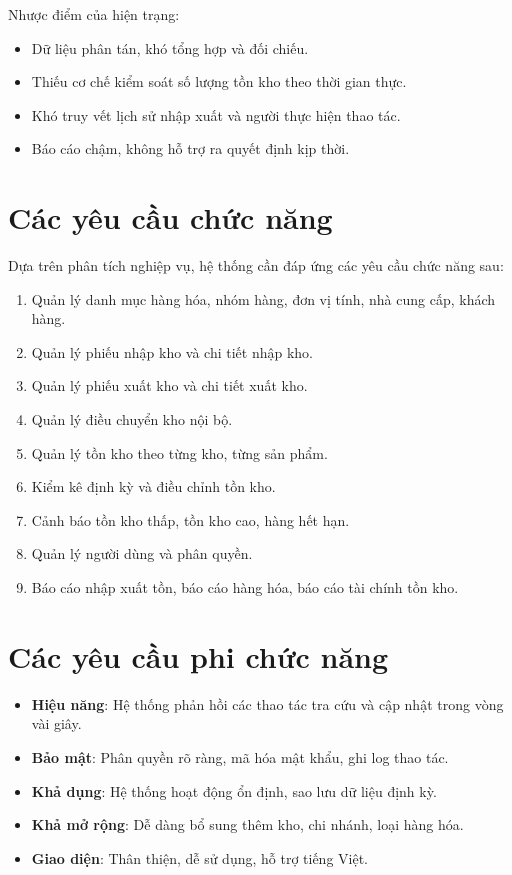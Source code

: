 Nhược điểm của hiện trạng:
\begin{itemize}[leftmargin=1.5cm]
    \item Dữ liệu phân tán, khó tổng hợp và đối chiếu.
    \item Thiếu cơ chế kiểm soát số lượng tồn kho theo thời gian thực.
    \item Khó truy vết lịch sử nhập xuất và người thực hiện thao tác.
    \item Báo cáo chậm, không hỗ trợ ra quyết định kịp thời.
\end{itemize}

\section{Các yêu cầu chức năng}

Dựa trên phân tích nghiệp vụ, hệ thống cần đáp ứng các yêu cầu chức năng sau:

\begin{enumerate}[leftmargin=1.5cm]
    \item Quản lý danh mục hàng hóa, nhóm hàng, đơn vị tính, nhà cung cấp, khách hàng.
    \item Quản lý phiếu nhập kho và chi tiết nhập kho.
    \item Quản lý phiếu xuất kho và chi tiết xuất kho.
    \item Quản lý điều chuyển kho nội bộ.
    \item Quản lý tồn kho theo từng kho, từng sản phẩm.
    \item Kiểm kê định kỳ và điều chỉnh tồn kho.
    \item Cảnh báo tồn kho thấp, tồn kho cao, hàng hết hạn.
    \item Quản lý người dùng và phân quyền.
    \item Báo cáo nhập xuất tồn, báo cáo hàng hóa, báo cáo tài chính tồn kho.
\end{enumerate}

\section{Các yêu cầu phi chức năng}

\begin{itemize}[leftmargin=1.5cm]
    \item \textbf{Hiệu năng}: Hệ thống phản hồi các thao tác tra cứu và cập nhật trong vòng vài giây.
    \item \textbf{Bảo mật}: Phân quyền rõ ràng, mã hóa mật khẩu, ghi log thao tác.
    \item \textbf{Khả dụng}: Hệ thống hoạt động ổn định, sao lưu dữ liệu định kỳ.
    \item \textbf{Khả mở rộng}: Dễ dàng bổ sung thêm kho, chi nhánh, loại hàng hóa.
    \item \textbf{Giao diện}: Thân thiện, dễ sử dụng, hỗ trợ tiếng Việt.
\end{itemize}


